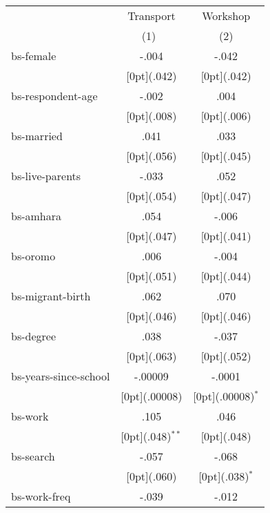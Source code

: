 \begin{tabular*}{\textwidth}{@{\extracolsep{\fill}}lcc}		
	& \multicolumn{1}{c}{Transport} &	\multicolumn{1}{c}{Workshop} \\
\cline{2-3}		
	& \multicolumn{1}{c}{(1)\mbox{\ }} &	\multicolumn{1}{c}{(2)} \\
\hline		
bs-female &	-.004 &	-.042 \\
&	\raisebox{.7ex}[0pt]{\scriptsize (.042)} &	\raisebox{.7ex}[0pt]{\scriptsize (.042)} \\
bs-respondent-age &	-.002 &	.004 \\
&	\raisebox{.7ex}[0pt]{\scriptsize (.008)} &	\raisebox{.7ex}[0pt]{\scriptsize (.006)} \\
bs-married &	.041 &	.033 \\
&	\raisebox{.7ex}[0pt]{\scriptsize (.056)} &	\raisebox{.7ex}[0pt]{\scriptsize (.045)} \\
bs-live-parents &	-.033 &	.052 \\
&	\raisebox{.7ex}[0pt]{\scriptsize (.054)} &	\raisebox{.7ex}[0pt]{\scriptsize (.047)} \\
bs-amhara &	.054 &	-.006 \\
&	\raisebox{.7ex}[0pt]{\scriptsize (.047)} &	\raisebox{.7ex}[0pt]{\scriptsize (.041)} \\
bs-oromo &	.006 &	-.004 \\
&	\raisebox{.7ex}[0pt]{\scriptsize (.051)} &	\raisebox{.7ex}[0pt]{\scriptsize (.044)} \\
bs-migrant-birth &	.062 &	.070 \\
&	\raisebox{.7ex}[0pt]{\scriptsize (.046)} &	\raisebox{.7ex}[0pt]{\scriptsize (.046)} \\
bs-degree &	.038 &	-.037 \\
&	\raisebox{.7ex}[0pt]{\scriptsize (.063)} &	\raisebox{.7ex}[0pt]{\scriptsize (.052)} \\
bs-years-since-school &	-.00009 &	-.0001 \\
&	\raisebox{.7ex}[0pt]{\scriptsize (.00008)} &	\raisebox{.7ex}[0pt]{\scriptsize (.00008)$^{*}$} \\
bs-work &	.105 &	.046 \\
&	\raisebox{.7ex}[0pt]{\scriptsize (.048)$^{**}$} &	\raisebox{.7ex}[0pt]{\scriptsize (.048)} \\
bs-search &	-.057 &	-.068 \\
&	\raisebox{.7ex}[0pt]{\scriptsize (.060)} &	\raisebox{.7ex}[0pt]{\scriptsize (.038)$^{*}$} \\
bs-work-freq &	-.039 &	-.012 \\

\end{tabular*}

